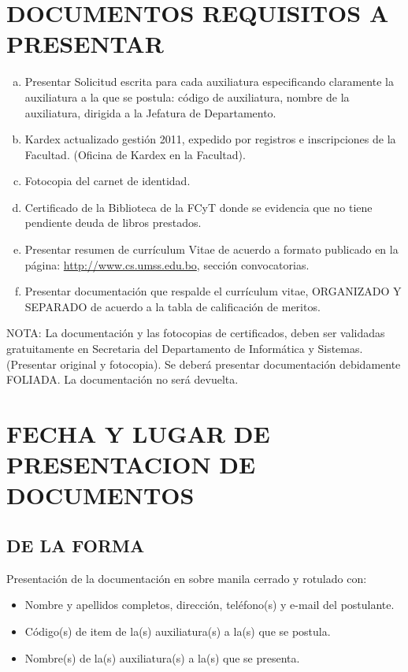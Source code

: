 \documentclass[letterpaper,11pt]{article}
\begin{document}
\section{DOCUMENTOS REQUISITOS A PRESENTAR}
\begin{enumerate}[a)]
\item Presentar Solicitud escrita para cada auxiliatura especificando claramente la auxiliatura a la que se postula: código de auxiliatura, nombre de la auxiliatura, dirigida a la Jefatura de Departamento.
\item Kardex actualizado gestión 2011, expedido por registros e inscripciones de la Facultad. (Oficina de Kardex en la Facultad).
\item Fotocopia del carnet de identidad.
\item Certificado de la Biblioteca de la FCyT donde se evidencia que no tiene pendiente deuda de libros prestados.
\item Presentar resumen de currículum Vitae de acuerdo a formato publicado en la página: \url{http://www.cs.umss.edu.bo}, sección convocatorias.
\item Presentar documentación que respalde el currículum vitae, ORGANIZADO Y SEPARADO de acuerdo a la tabla de calificación de meritos.
\end{enumerate}

NOTA: La documentación y las fotocopias de certificados, deben ser validadas gratuitamente en Secretaria del Departamento de Informática y Sistemas. (Presentar original y fotocopia). Se deberá presentar documentación debidamente FOLIADA. La documentación no será devuelta.

\section{FECHA Y LUGAR DE PRESENTACION DE DOCUMENTOS}
\subsection{DE LA FORMA}
Presentación de la documentación en sobre manila cerrado y rotulado con:

\begin{itemize}
\item Nombre y apellidos completos, dirección, teléfono(s) y e-mail del postulante.
\item Código(s) de item de la(s) auxiliatura(s) a la(s) que se postula.
\item Nombre(s) de la(s) auxiliatura(s) a la(s) que se presenta.
\end{itemize}
\end{document}
